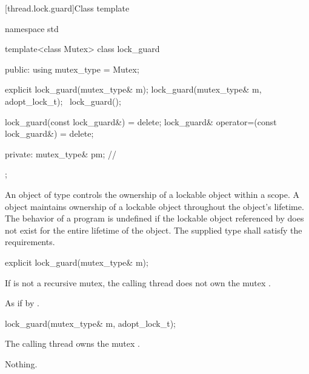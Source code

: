 [thread.lock.guard]{Class template }

%
\begin{codeblock}
namespace std {
  template<class Mutex>
  class lock_guard {
  public:
    using mutex_type = Mutex;

    explicit lock_guard(mutex_type& m);
    lock_guard(mutex_type& m, adopt_lock_t);
    ~lock_guard();

    lock_guard(const lock_guard&) = delete;
    lock_guard& operator=(const lock_guard&) = delete;

  private:
    mutex_type& pm;             // \expos
  };
}
\end{codeblock}

\pnum
An object of type  controls the ownership of a lockable object
within a scope. A  object maintains ownership of a lockable
object throughout the  object's lifetime.
The behavior of a program is undefined if the lockable object referenced by
 does not exist for the entire lifetime of the 
object. The supplied  type shall satisfy the 
requirements.

%
\begin{itemdecl}
explicit lock_guard(mutex_type& m);
\end{itemdecl}

\begin{itemdescr}
\pnum
\requires If  is not a recursive mutex,
the calling thread does not own the mutex .

\pnum
\effects As if by .

\pnum
\postconditions {}
\end{itemdescr}

%
\begin{itemdecl}
lock_guard(mutex_type& m, adopt_lock_t);
\end{itemdecl}

\begin{itemdescr}
\pnum
\requires The calling thread owns the mutex .

\pnum
\postconditions {}

\pnum
\throws Nothing.
\end{itemdescr}

